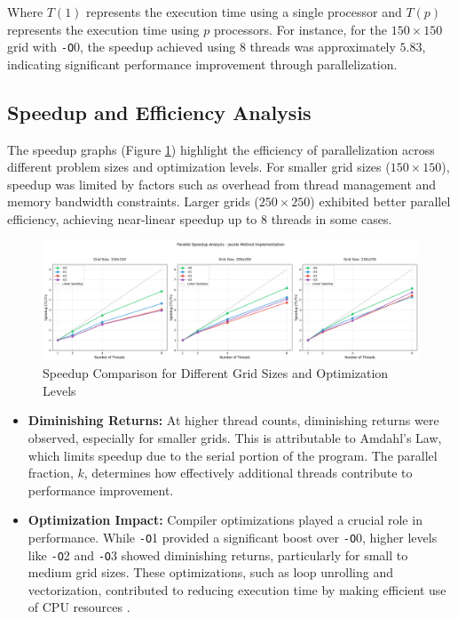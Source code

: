 \documentclass{article}
\begin{document}
Where $T(1)$ represents the execution time using a single processor and $T(p)$ represents the execution time using $p$ processors. For instance, for the $150\times150$ grid with \texttt{-O}0, the speedup achieved using $8$ threads was approximately $5.83$, indicating significant performance improvement through parallelization.

\subsection{Speedup and Efficiency Analysis}

The speedup graphs (Figure \ref{fig:plot2}) highlight the efficiency of parallelization across different problem sizes and optimization levels. For smaller grid sizes ($150\times150$), speedup was limited by factors such as overhead from thread management and memory bandwidth constraints. Larger grids ($250\times250$) exhibited better parallel efficiency, achieving near-linear speedup up to 8 threads in some cases.

\begin{figure}[H]
    \centering
    \includegraphics[width=\linewidth]{Images/Plot2.png}
    \caption{Speedup Comparison for Different Grid Sizes and Optimization Levels}
    \label{fig:plot2}
\end{figure}

\begin{itemize}
    \item \textbf{Diminishing Returns:} At higher thread counts, diminishing returns were observed, especially for smaller grids. This is attributable to Amdahl's Law, which limits speedup due to the serial portion of the program. The parallel fraction, $k$, determines how effectively additional threads contribute to performance improvement.
    \item \textbf{Optimization Impact:} Compiler optimizations played a crucial role in performance. While \texttt{-O}1 provided a significant boost over \texttt{-O}0, higher levels like \texttt{-O}2 and \texttt{-O}3 showed diminishing returns, particularly for small to medium grid sizes. These optimizations, such as loop unrolling and vectorization, contributed to reducing execution time by making efficient use of CPU resources \parencite{chapman2007openmp}.
\end{itemize}
\end{document}
